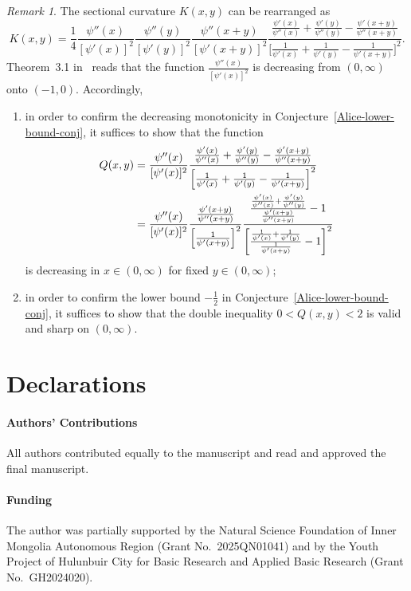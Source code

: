 \documentclass[reqno]{amsart}%
\theoremstyle{plain}
\theoremstyle{remark}
\newtheorem{rem}{Remark}
\begin{document}
\begin{rem}
The sectional curvature $K(x,y)$ can be rearranged as
\begin{equation*}
K(x,y)=\frac{1}{4}\frac{\psi''(x)}{[\psi'(x)]^2}\frac{\psi''(y)}{[\psi'(y)]^2}\frac{\psi''(x+y)}{[\psi'(x+y)]^2} \frac{\frac{\psi'(x)}{\psi''(x)}+\frac{\psi'(y)}{\psi''(y)}-\frac{\psi'(x+y)}{\psi''(x+y)}}
{\bigl[\frac{1}{\psi'(x)}+\frac{1}{\psi'(y)}-\frac{1}{\psi'(x+y)}\bigr]^2}.
\end{equation*}
Theorem~3.1 in~\cite{RIMA-D-20-01130.tex} reads that the function $\frac{\psi''(x)}{[\psi'(x)]^2}$ is decreasing from $(0,\infty)$ onto $(-1,0)$. Accordingly, 
\begin{enumerate}
\item
in order to confirm the decreasing monotonicity in Conjecture~\ref{Alice-lower-bound-conj}, it suffices to show that the function
\begin{align*}
Q(x,y)&=\frac{\psi''(x)}{[\psi'(x)]^2}\frac{\frac{\psi'(x)}{\psi''(x)}+\frac{\psi'(y)}{\psi''(y)}-\frac{\psi'(x+y)}{\psi''(x+y)}}
{\Bigl[\frac{1}{\psi'(x)}+\frac{1}{\psi'(y)}-\frac{1}{\psi'(x+y)}\Bigr]^2}\\
&=\frac{\psi''(x)}{[\psi'(x)]^2}\frac{\frac{\psi'(x+y)}{\psi''(x+y)}}{\Bigl[\frac{1}{\psi'(x+y)}\Bigr]^2}\frac{\frac{\frac{\psi'(x)}{\psi''(x)}+\frac{\psi'(y)}{\psi''(y)}} {\frac{\psi'(x+y)}{\psi''(x+y)}}-1}
{\biggl[\frac{\frac{1}{\psi'(x)}+\frac{1}{\psi'(y)}}{\frac{1}{\psi'(x+y)}}-1\biggr]^2}
\end{align*}
is decreasing in $x\in(0,\infty)$ for fixed $y\in(0,\infty)$;
\item
in order to confirm the lower bound $-\frac{1}{2}$ in Conjecture~\ref{Alice-lower-bound-conj}, it suffices to show that the double inequality $0<Q(x,y)<2$ is valid and sharp on $(0,\infty)$.
\end{enumerate}
\end{rem}

\section{Declarations}

\paragraph{\bf Authors' Contributions}
All authors contributed equally to the manuscript and read and approved the final manuscript. 

\paragraph{\bf Funding}
The author was partially supported by the Natural Science Foundation of Inner Mongolia Autonomous Region (Grant No.~2025QN01041) and by the Youth Project of Hulunbuir City for Basic Research and Applied Basic Research (Grant No.~GH2024020).
\end{document}
